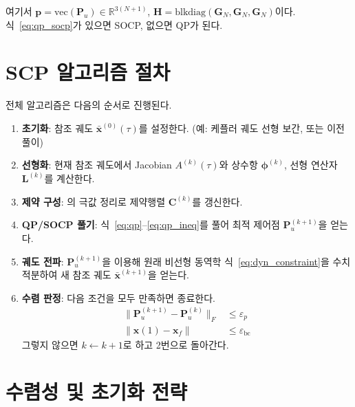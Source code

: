 \documentclass[11pt]{article}
\begin{document}
여기서 $\mathbf{p} = \mathrm{vec}(\mathbf{P}_u) \in \mathbb{R}^{3(N+1)}$,
$\mathbf{H} = \mathrm{blkdiag}(\mathbf{G}_N, \mathbf{G}_N, \mathbf{G}_N)$이다.
식~\eqref{eq:qp_socp}가 있으면 SOCP, 없으면 QP가 된다.

\section{SCP 알고리즘 절차}

전체 알고리즘은 다음의 순서로 진행된다.

\begin{enumerate}
  \item \textbf{초기화}: 참조 궤도 $\bar{\mathbf{x}}^{(0)}(\tau)$를 설정한다.
        (예: 케플러 궤도 선형 보간, 또는 이전 풀이)

  \item \textbf{선형화}: 현재 참조 궤도에서 Jacobian $A^{(k)}(\tau)$와
        상수항 $\boldsymbol{\phi}^{(k)}$, 선형 연산자 $\mathbf{L}^{(k)}$를 계산한다.

  \item \textbf{제약 구성}: \cite{report005}의 극값 정리로 제약행렬 $\mathbf{C}^{(k)}$를 갱신한다.

  \item \textbf{QP/SOCP 풀기}: 식~\eqref{eq:qp}--\eqref{eq:qp_ineq}를 풀어
        최적 제어점 $\mathbf{P}_u^{(k+1)}$을 얻는다.

  \item \textbf{궤도 전파}: $\mathbf{P}_u^{(k+1)}$을 이용해 원래 비선형 동역학
        식~\eqref{eq:dyn_constraint}을 수치 적분하여
        새 참조 궤도 $\bar{\mathbf{x}}^{(k+1)}$을 얻는다.

  \item \textbf{수렴 판정}: 다음 조건을 모두 만족하면 종료한다.
        \begin{align}
          \|\mathbf{P}_u^{(k+1)} - \mathbf{P}_u^{(k)}\|_F &\leq \varepsilon_p \label{eq:conv1}\\
          \|\mathbf{x}(1) - \mathbf{x}_f\| &\leq \varepsilon_{\mathrm{bc}} \label{eq:conv2}
        \end{align}
        그렇지 않으면 $k \leftarrow k+1$로 하고 2번으로 돌아간다.
\end{enumerate}

\section{수렴성 및 초기화 전략}
\end{document}
